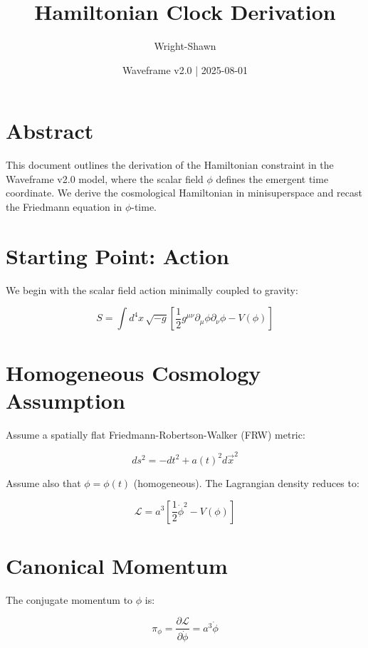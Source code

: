 \documentclass[12pt]{article}
\title{Hamiltonian Clock Derivation}
\author{Wright-Shawn}
\date{Waveframe v2.0 | 2025-08-01}
\begin{document}
\maketitle

\section*{Abstract}
This document outlines the derivation of the Hamiltonian constraint in the Waveframe v2.0 model, where the scalar field $\phi$ defines the emergent time coordinate. We derive the cosmological Hamiltonian in minisuperspace and recast the Friedmann equation in $\phi$-time.

\section{Starting Point: Action}

We begin with the scalar field action minimally coupled to gravity:

\begin{equation}
S = \int d^4x \, \sqrt{-g} \left[ \frac{1}{2} g^{\mu\nu} \partial_\mu \phi \partial_\nu \phi - V(\phi) \right]
\end{equation}

\section{Homogeneous Cosmology Assumption}

Assume a spatially flat Friedmann-Robertson-Walker (FRW) metric:

\begin{equation}
ds^2 = -dt^2 + a(t)^2 d\vec{x}^2
\end{equation}

Assume also that $\phi = \phi(t)$ (homogeneous). The Lagrangian density reduces to:

\begin{equation}
\mathcal{L} = a^3 \left[ \frac{1}{2} \dot{\phi}^2 - V(\phi) \right]
\end{equation}

\section{Canonical Momentum}

The conjugate momentum to $\phi$ is:

\begin{equation}
\pi_\phi = \frac{\partial \mathcal{L}}{\partial \dot{\phi}} = a^3 \dot{\phi}
\end{equation}
\end{document}

